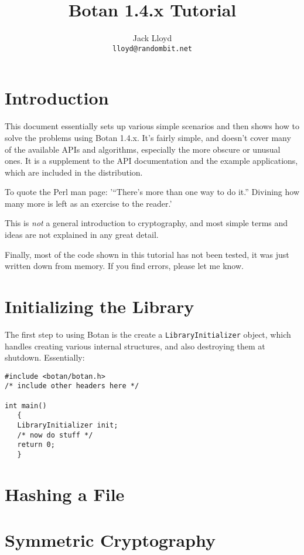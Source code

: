 \documentclass{article}
\title{\textbf{Botan 1.4.x Tutorial}}
\author{Jack Lloyd \\
        \texttt{lloyd@randombit.net}}
\date{}
\newcommand{\type}[1]{\texttt{#1}}
\begin{document}
\maketitle

\tableofcontents

\parskip=5pt
\pagebreak

\section{Introduction}

This document essentially sets up various simple scenarios and then shows how
to solve the problems using Botan 1.4.x. It's fairly simple, and doesn't cover
many of the available APIs and algorithms, especially the more obscure or
unusual ones. It is a supplement to the API documentation and the example
applications, which are included in the distribution.

To quote the Perl man page: '``There's more than one way to do it.'' Divining
how many more is left as an exercise to the reader.'

This is \emph{not} a general introduction to cryptography, and most simple
terms and ideas are not explained in any great detail.

Finally, most of the code shown in this tutorial has not been tested, it was
just written down from memory. If you find errors, please let me know.

\section{Initializing the Library}

The first step to using Botan is the create a \type{LibraryInitializer} object,
which handles creating various internal structures, and also destroying them at
shutdown. Essentially:

\begin{verbatim}
#include <botan/botan.h>
/* include other headers here */

int main()
   {
   LibraryInitializer init;
   /* now do stuff */
   return 0;
   }
\end{verbatim}

\section{Hashing a File}



\section{Symmetric Cryptography}
\end{document}
